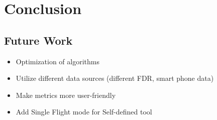 
\chapter{Conclusion} \label{ch:conclusion}



\section{Future Work} \label{sec:future_work}

	\begin{itemize}
    	\item Optimization of algorithms
        \item Utilize different data sources (different FDR, smart phone data)
        \item Make metrics more user-friendly
        \item Add Single Flight mode for Self-defined tool
    \end{itemize}